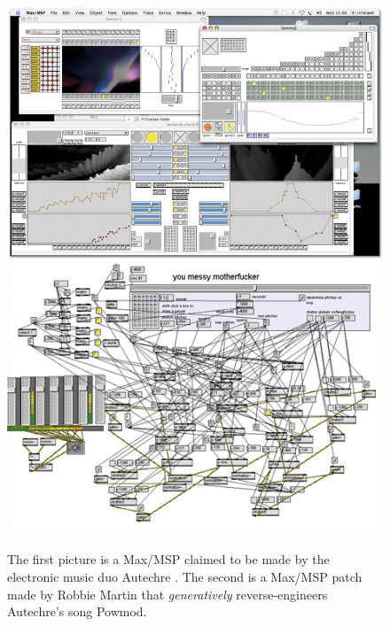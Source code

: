 \begin{figure}
    \centering
    \includegraphics[width=\textwidth]{pic/autechre-2.jpg}
    \includegraphics[width=\textwidth]{pic/autechre-1.jpg}
    \caption[Autechre related Max/MSP patches]{The first picture is a
      Max/MSP claimed to be made by the electronic music duo
      Autechre \cite{autechrepatch}. The second is a Max/MSP patch made
      by Robbie Martin that \emph{generatively} reverse-engineers
      Autechre's song Powmod.}
  \label{fig:autechre}
\end{figure}

